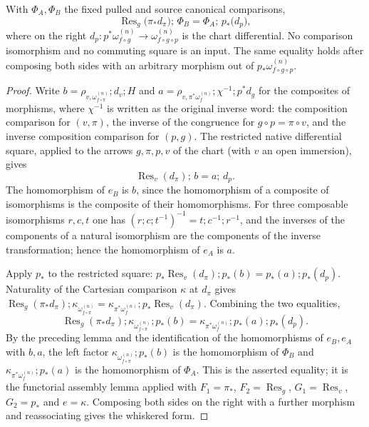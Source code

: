 \begin{theorem}
\label{thm:kn-native-chart-differential-square}
\leanok
With $\Phi_A,\Phi_B$ the fixed pulled and source canonical comparisons,
\[
 \operatorname{Res}_g\bigl(\pi_*d_\pi\bigr);\,\Phi_B
 =\Phi_A;\,p_*\bigl(d_p\bigr),
\]
where on the right $d_p:p^*\omega_{f\circ g}^{(n)}\to
\omega_{f\circ g\circ p}^{(n)}$ is the chart differential. No comparison
isomorphism and no commuting square is an input. The same equality holds
after composing both sides with an arbitrary morphism out of
$p_*\omega_{f\circ g\circ p}^{(n)}$.
\end{theorem}
\begin{proof}
Write $b=\rho_{v,\omega_{f\circ\pi}^{(n)}};d_v;H$ and
$a=\rho_{v,\pi^*\omega_f^{(n)}};\chi^{-1};p^*d_g$ for the composites of
morphisms, where $\chi^{-1}$ is written as the original inverse word: the
composition comparison for $(v,\pi)$, the inverse of the congruence for
$g\circ p=\pi\circ v$, and the inverse composition comparison for $(p,g)$.
The restricted native differential square, applied to the arrows $g,\pi,p,v$
of the chart (with $v$ an open immersion), gives
\[
 \operatorname{Res}_v(d_\pi);\,b=a;\,d_p .
\]
The homomorphism of $e_B$ is $b$, since the homomorphism of a composite of
isomorphisms is the composite of their homomorphisms. For three composable
isomorphisms $r,c,t$ one has $(r;c;t^{-1})^{-1}=t;c^{-1};r^{-1}$, and the
inverses of the components of a natural isomorphism are the components of
the inverse transformation; hence the homomorphism of $e_A$ is $a$.

Apply $p_*$ to the restricted square:
$p_*\operatorname{Res}_v(d_\pi);p_*(b)=p_*(a);p_*(d_p)$. Naturality of the
Cartesian comparison $\kappa$ at $d_\pi$ gives
$\operatorname{Res}_g(\pi_*d_\pi);\kappa_{\omega_{f\circ\pi}^{(n)}}
=\kappa_{\pi^*\omega_f^{(n)}};p_*\operatorname{Res}_v(d_\pi)$. Combining the
two equalities,
\[
 \operatorname{Res}_g(\pi_*d_\pi);\kappa_{\omega_{f\circ\pi}^{(n)}};p_*(b)
 =\kappa_{\pi^*\omega_f^{(n)}};p_*(a);p_*(d_p).
\]
By the preceding lemma and the identification of the homomorphisms of
$e_B,e_A$ with $b,a$, the left factor
$\kappa_{\omega_{f\circ\pi}^{(n)}};p_*(b)$ is the homomorphism of $\Phi_B$ and
$\kappa_{\pi^*\omega_f^{(n)}};p_*(a)$ is the homomorphism of $\Phi_A$. This is
the asserted equality; it is the functorial assembly lemma applied with
$F_1=\pi_*$, $F_2=\operatorname{Res}_g$, $G_1=\operatorname{Res}_v$,
$G_2=p_*$ and $e=\kappa$. Composing both sides on the right with a further
morphism and reassociating gives the whiskered form.
\end{proof}
